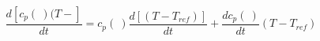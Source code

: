 \begin{equation}
\frac{d [c_p(\ ) (T-]}{dt} =c_p(\ ) \frac{d [ (T- T_{ref})]}{dt} + \frac{d c_p(\ )}{dt} (T- T_{ref})
\end{equation}